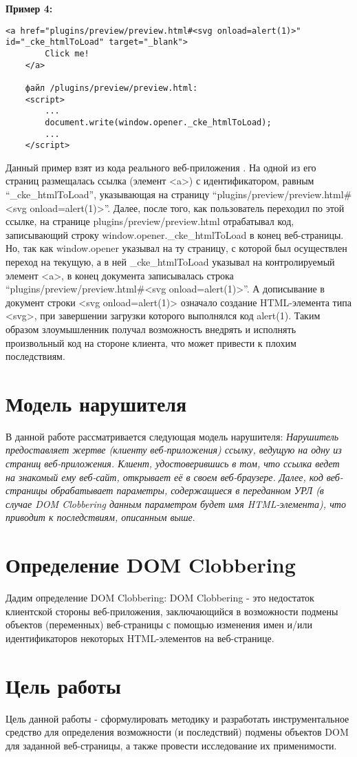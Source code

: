 \bigskip
\textbf{Пример 4:}

\begin{lstlisting}[caption=исполнение произвольного кода]
	<a href="plugins/preview/preview.html#<svg onload=alert(1)>" id="_cke_htmlToLoad" target="_blank">
		Click me!
	</a>

	файл /plugins/preview/preview.html:
	<script>
		...
		document.write(window.opener._cke_htmlToLoad);
		...
	</script>
\end{lstlisting}
\bigskip


Данный пример взят из кода реального веб-приложения \cite{mario}. На одной из его страниц размещалась ссылка (элемент <a>) с идентификатором, равным \\
“\_cke\_htmlToLoad”, указывающая на страницу “plugins/preview/preview.html\#<svg onload=alert(1)>”. Далее, после того, как пользователь переходил по этой ссылке, на странице plugins/preview/preview.html отрабатывал код, записывающий строку window.opener.\_cke\_htmlToLoad в конец веб-страницы. Но, так как window.opener указывал на ту страницу, с которой был осуществлен переход на текущую, а в ней \_cke\_htmlToLoad указывал на контролируемый элемент <a>, в конец документа записывалась строка “plugins/preview/preview.html\#<svg onload=alert(1)>”. А дописывание в документ строки <svg onload=alert(1)> означало создание HTML-элемента типа <svg>, при завершении загрузки которого выполнялся код alert(1).
Таким образом злоумышленник получал возможность внедрять и исполнять произвольный код на стороне клиента, что может привести к плохим последствиям.

\section{Модель нарушителя}
В данной работе рассматривается следующая модель нарушителя: \textit{Нарушитель предоставляет жертве (клиенту веб-приложения) ссылку, ведущую на одну из страниц веб-приложения. Клиент, удостоверившись в том, что ссылка ведет на знакомый ему веб-сайт, открывает её в своем веб-браузере. Далее, код веб-страницы обрабатывает параметры, содержащиеся в переданном УРЛ (в случае DOM Clobbering данным параметром будет имя HTML-элемента), что приводит к последствиям, описанным выше}.
\section{Определение DOM Clobbering}

Дадим определение DOM Clobbering: DOM Clobbering - это недостаток клиентской стороны веб-приложения, заключающийся в возможности подмены объектов (переменных) веб-страницы с помощью изменения имен и/или идентификаторов некоторых HTML-элементов на веб-странице.

\section{Цель работы}
Цель данной работы - сформулировать методику и разработать инструментальное средство для определения возможности (и последствий) подмены объектов DOM для заданной веб-страницы, а также провести исследование их применимости.